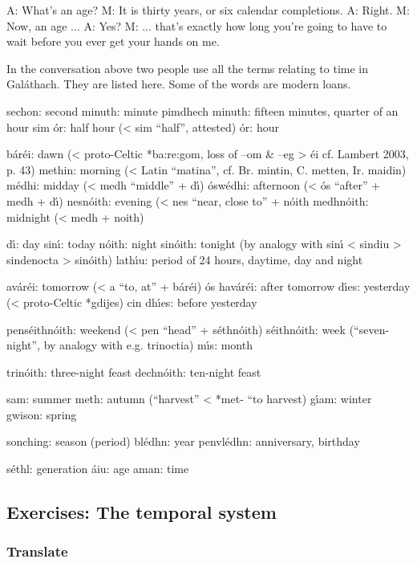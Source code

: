 A: What’s an age?
M: It is thirty years, or six calendar completions.
A: Right.
M: Now, an age ...
A: Yes?
M: ... that’s exactly how long you’re going to have to wait before you ever get your hands on me.

In the conversation above two people use all the terms relating to time in Gal\'{a}thach. They are listed here. Some of the words are modern loans.

sechon: second 
minuth: minute 
pimdhech minuth: fifteen minutes, quarter of an hour 
sim \'{o}r: half hour (< sim “half”, attested)
\'{o}r: hour 

b\'{a}r\'{e}i: dawn (< proto-Celtic *ba:re:gom, loss of –om \& –eg > \'{e}i cf. Lambert 2003, p. 43)
methin: morning (< Latin “matina”, cf. Br. mintin, C. metten, Ir. maidin)
m\'{e}dhi: midday (< medh “middle” + d\'{\i})
\'{o}sw\'{e}dhi: afternoon (< \'{o}s “after” + medh + d\'{\i})
nesn\'{o}ith: evening (< nes “near, close to” + n\'{o}ith
medhn\'{o}ith: midnight (< medh + noith)

d\'{\i}: day
sin\'{\i}: today
n\'{o}ith: night
sin\'{o}ith: tonight (by analogy with sin\'{\i} < sindiu > sindenocta > sin\'{o}ith)
lath\'{\i}u: period of 24 hours, daytime, day and night

av\'{a}r\'{e}i: tomorrow (< a “to, at” + b\'{a}r\'{e}i)
\'{o}s hav\'{a}r\'{e}i: after tomorrow
d\'{\i}es: yesterday (< proto-Celtic *gdijes)
cin dh\'{\i}es: before yesterday

pens\'{e}ithn\'{o}ith: weekend (< pen “head” + s\'{e}thn\'{o}ith)
s\'{e}ithn\'{o}ith: week (“seven-night”, by analogy with e.g. trinoctia)
m\'{\i}s: month

trin\'{o}ith: three-night feast
dechn\'{o}ith: ten-night feast

sam: summer
meth: autumn (“harvest” < *met- “to harvest)
g\'{\i}am: winter
gwison: spring

sonching: season (period)
bl\'{e}dhn: year
penvl\'{e}dhn: anniversary, birthday

s\'{e}thl: generation
\'{a}iu: age
aman: time

\subsection{Exercises: The temporal system}

\subsubsection{Translate}

